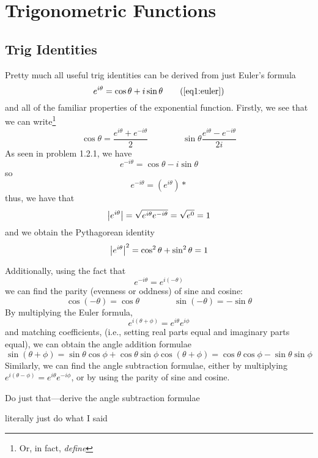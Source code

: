 \chapter{Trigonometric Functions}\label{ch:trig}
\section{Trig Identities}
Pretty much all useful trig identities can be derived from just Euler's formula
\begin{equation}
	e^{i\theta} = \cos\theta + i\sin\theta \tag{\ref{eq1:euler}}
\end{equation}
and all of the familiar properties of the exponential function. Firstly, we see that we can write\footnote{Or, in fact, \emph{define}}
\begin{equation}
	\cos\theta = \frac{e^{i\theta}+e^{-i\theta}}{2}\qquad\qquad\sin\theta\frac{e^{i\theta}-e^{-i\theta}}{2i}
\end{equation}
As seen in problem 1.2.1, we have
\[e^{-i\theta} = \cos\theta - i\sin\theta\]
so
\[e^{-i\theta} = \left(e^{i\theta}\right)\ast\]
thus, we have that 
\[\left|e^{i\theta}\right|=\sqrt{e^{i\theta}e^{-i\theta}} = \sqrt{e^{0}} = 1\]
and we obtain the Pythagorean identity
\begin{equation}
	\left|e^{i\theta}\right|^2 = \cos^2\theta+\sin^2\theta = 1
\end{equation}

Additionally, using the fact that
\[e^{-i\theta} = e^{i(-\theta)}\]
we can find the parity (evenness or oddness) of sine and cosine:
\begin{equation}
	\cos(-\theta) = \cos\theta \qquad\qquad \sin(-\theta) =-\sin\theta
\end{equation}
By multiplying the Euler formula,
\[e^{i(\theta+\phi)} = e^{i\theta}e^{i\phi}\]
and matching coefficients, (i.e., setting real parts equal and imaginary parts equal), we can obtain the angle addition formulae
\begin{subequations}
	\begin{equation}
		\sin(\theta+\phi) = \sin\theta\cos\phi + \cos\theta\sin\phi
	\end{equation}
	\begin{equation}
		\cos(\theta+\phi) = \cos\theta\cos\phi -\sin\theta\sin\phi
	\end{equation}
\end{subequations}
Similarly, we can find the angle subtraction formulae, either by multiplying \(e^{i(\theta-\phi)} = e^{i\theta}e^{-i\phi}\), or by using the parity of sine and cosine. 
\begin{exercise}
	Do just that---derive the angle subtraction formulae
\begin{solution}
	literally just do what I said
\end{solution}
\end{exercise}

